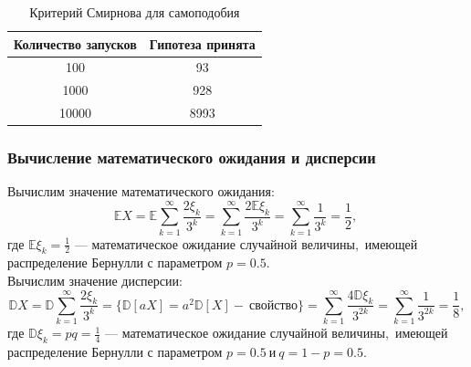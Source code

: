 \documentclass[11pt]{article}
\begin{document}
	\begin{table}[h]	
		\begin{center}
			\begin{tabular}[c]{ | c | c |  }
				\hline
				Количество запусков & Гипотеза принята \\ \hline
				100 & 93  \\
				1000 & 928  \\
				10000 & 8993 \\
				\hline
				
			\end{tabular}
		\end{center}
		\caption{\label{tab:canonsummary3}Критерий Смирнова для самоподобия}
	\end{table}
	\subsubsection{Вычисление математического ожидания и дисперсии}
	\indent Вычислим значение математического ожидания:
	$$\mathbb EX = \mathbb E\sum_{k = 1}^{\infty}\frac{2\xi_k}{3^k} = \sum_{k = 1}^{\infty}\frac{2\mathbb E\xi_k}{3^k} =\sum_{k = 1}^{\infty}\frac{1}{3^k} = \frac{1}{2},\ $$
	где  {$\mathbb E\xi_k = \frac{1}{2} $} --- математическое ожидание случайной величины,\ имеющей распределение Бернулли с параметром  {$p = 0.5$}.  \\
	\indent Вычислим значение дисперсии:
	$$\mathbb DX = \mathbb D\sum_{k=1}^{\infty}\frac{2\xi_k}{3^k} = \{\mathbb D[aX] = a^2\mathbb D[X] -~ \text{свойство}\} = \sum_{k = 1}^{\infty}\frac{4\mathbb D\xi_k}{3^{2k}} = \sum_{k = 1}^{\infty}\frac{1}{3^{2k}} = \frac{1}{8},$$
	где  {$\mathbb D\xi_k = pq = \frac{1}{4} $} --- математическое ожидание случайной величины,\ имеющей распределение Бернулли с параметром  {$p = 0.5~ \text{и}~ q = 1 - p = 0.5$}.
\end{document}
